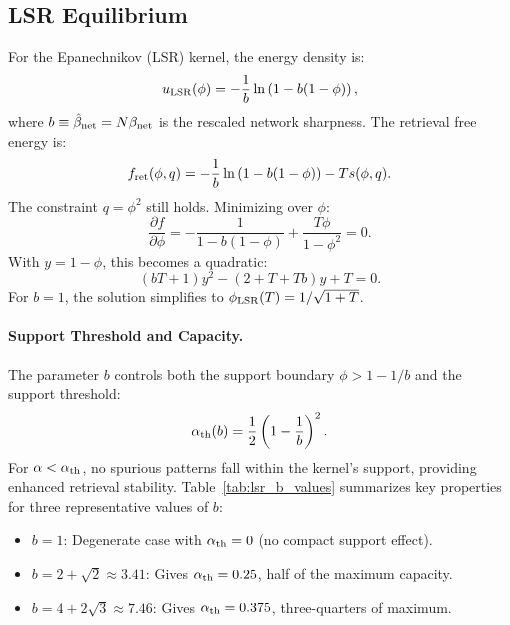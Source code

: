 \documentclass{article}
\theoremstyle{plain}
\theoremstyle{definition}
\theoremstyle{remark}
\begin{document}
\subsection{LSR Equilibrium}

For the Epanechnikov (LSR) kernel, the energy density is:
\begin{equation}
    u_{\rm LSR}(\phi) = -\frac{1}{b} \ln\left(1 - b(1-\phi)\right),
\end{equation}
where $b \equiv \hat{\beta}_{\rm net} = N\beta_{\rm net}$ is the rescaled network sharpness. The retrieval free energy is:
\begin{equation}
    f_{\rm ret}(\phi, q) = -\frac{1}{b} \ln\left(1 - b(1-\phi)\right) - T s(\phi, q).
\end{equation}
The constraint $q = \phi^2$ still holds. Minimizing over $\phi$:
\begin{equation}
    \frac{\partial f}{\partial \phi} = -\frac{1}{1 - b(1-\phi)} + \frac{T\phi}{1-\phi^2} = 0.
\end{equation}
With $y = 1 - \phi$, this becomes a quadratic:
\begin{equation}
    (bT + 1)y^2 - (2 + T + Tb)y + T = 0.
    \label{eq:lsr_quadratic}
\end{equation}
For $b = 1$, the solution simplifies to $\phi_{\rm LSR}(T) = 1/\sqrt{1+T}$.

\paragraph{Support Threshold and Capacity.} The parameter $b$ controls both the support boundary $\phi > 1 - 1/b$ and the support threshold:
\begin{equation}
    \alpha_{\rm th}(b) = \frac{1}{2}\left(1 - \frac{1}{b}\right)^2.
\end{equation}
For $\alpha < \alpha_{\rm th}$, no spurious patterns fall within the kernel's support, providing enhanced retrieval stability. Table~\ref{tab:lsr_b_values} summarizes key properties for three representative values of $b$:
\begin{itemize}
    \item $b = 1$: Degenerate case with $\alpha_{\rm th} = 0$ (no compact support effect).
    \item $b = 2 + \sqrt{2} \approx 3.41$: Gives $\alpha_{\rm th} = 0.25$, half of the maximum capacity.
    \item $b = 4 + 2\sqrt{3} \approx 7.46$: Gives $\alpha_{\rm th} = 0.375$, three-quarters of maximum.
\end{itemize}
\end{document}
